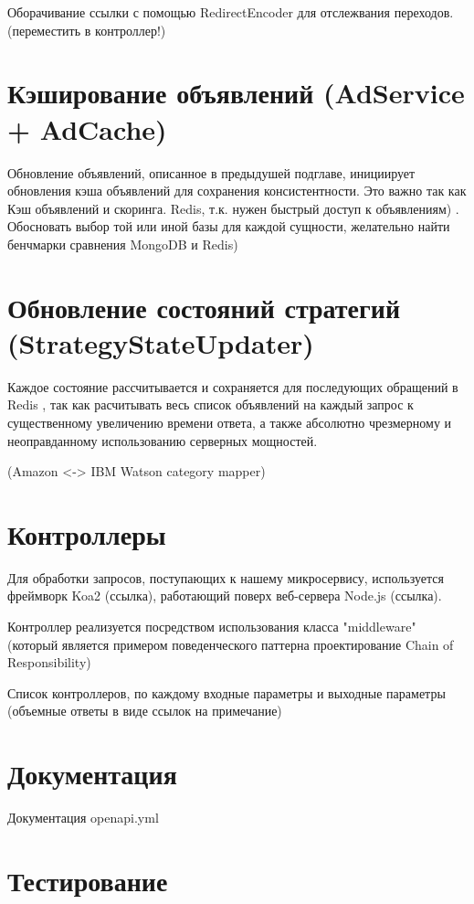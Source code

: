 \documentclass[times]{itmo-student-thesis}
\begin{document}
Оборачивание ссылки с помощью RedirectEncoder для отслежвания переходов. (переместить в контроллер!)



\section{Кэширование объявлений (AdService + AdCache)}

Обновление объявлений, описанное в предыдушей подглаве, инициирует обновления кэша объявлений для сохранения консистентности. Это важно так как 
Кэш объявлений и скоринга. Redis, т.к. нужен быстрый доступ к объявлениям) . Обосновать выбор той или иной базы для каждой сущности, желательно найти бенчмарки сравнения MongoDB и Redis)

\section{Обновление состояний стратегий (StrategyStateUpdater)}

Каждое состояние рассчитывается и сохраняется для последующих обращений в Redis , так как расчитывать весь список объявлений на каждый запрос к существенному увеличению времени ответа, а также абсолютно чрезмерному и неоправданному использованию серверных мощностей.

(Amazon <-> IBM Watson category mapper)

\section{Контроллеры}

Для обработки запросов, поступающих к нашему микросервису, используется фреймворк Koa2 (ссылка), работающий поверх веб-сервера Node.js (ссылка).

Контроллер реализуется посредством использования класса "middleware" (который является примером поведенческого паттерна проектирование Chain of Responsibility)

Список контроллеров, по каждому входные параметры и выходные параметры (объемные ответы в виде ссылок на примечание)

\section{Документация}

Документация openapi.yml


\section{Тестирование}
\end{document}
